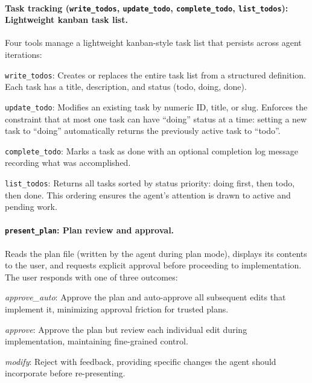 \paragraph{Task tracking (\texttt{write\_todos}, \texttt{update\_todo}, \texttt{complete\_todo}, \texttt{list\_todos}): Lightweight kanban task list.} Four tools manage a lightweight kanban-style task list that persists across agent iterations:

\begin{packeditemize}
\item \texttt{write\_todos}: Creates or replaces the entire task list from a structured definition. Each task has a title, description, and status (todo, doing, done).
\item \texttt{update\_todo}: Modifies an existing task by numeric ID, title, or slug. Enforces the constraint that at most one task can have ``doing'' status at a time: setting a new task to ``doing'' automatically returns the previously active task to ``todo''.
\item \texttt{complete\_todo}: Marks a task as done with an optional completion log message recording what was accomplished.
\item \texttt{list\_todos}: Returns all tasks sorted by status priority: doing first, then todo, then done. This ordering ensures the agent's attention is drawn to active and pending work.
\end{packeditemize}

\paragraph{\texttt{present\_plan}: Plan review and approval.} Reads the plan file (written by the agent during plan mode), displays its contents to the user, and requests explicit approval before proceeding to implementation. The user responds with one of three outcomes:

\begin{packeditemize}
\item \emph{approve\_auto}: Approve the plan and auto-approve all subsequent edits that implement it, minimizing approval friction for trusted plans.
\item \emph{approve}: Approve the plan but review each individual edit during implementation, maintaining fine-grained control.
\item \emph{modify}: Reject with feedback, providing specific changes the agent should incorporate before re-presenting.
\end{packeditemize}

